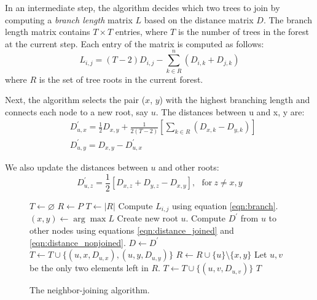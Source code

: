 \documentclass[11pt,letterpaper]{article}
\let\oldReturn\Return
\renewcommand{\Return}{\State\oldReturn}
\theoremstyle{definition}
\begin{document}
In an intermediate step, the algorithm decides which two trees to join by computing a \textit{branch length} matrix $L$ based on the distance matrix $D$. The branch length matrix contains $T \times T$ entries, where $T$ is the number of trees in the forest at the current step. Each entry of the matrix is computed as follows:  
\begin{equation}
  L_{i, j} = (T - 2) D_{i, j} - \sum_{k \in R}^n (D_{i, k} + D_{j, k})
  \label{eqn:branch}
\end{equation} where $R$ is the set of tree roots in the current forest.

Next, the algorithm selects the pair ($x$, $y$) with the highest branching length and connects each node to a new root, say $u$. The distances between u and x, y are:  
\begin{equation}
\begin{split}
  & D_{u, x}^{'} = \frac{1}{2} D_{x, y} + \frac{1}{2(T - 2)} \left[ \sum_{k \in R} (D_{x, k} - D_{y, k}) \right] 
\\  
& D_{u, y}^{'} = D_{x, y} - D_{u, x}^{'}
\end{split}
\label{eqn:distance_joined}
\end{equation}

We also update the distances between $u$ and other roots:
\begin{equation}
  D_{u, z}^{'} = \frac{1}{2} \left[ D_{x, z} + D_{y, z} - D_{x, y} \right], \ \ \ \text{for} \ z \neq x, y
\label{eqn:distance_nonjoined}
\end{equation}

\begin{figure}
  \begin{algorithmic}[1]
      \State $T \leftarrow \varnothing$ 
      \State $R \leftarrow P$
        \State $T \leftarrow |R|$
          \State Compute $L_{i, j}$ using equation \ref{eqn:branch}. 
        \EndFor
        \State $(x, y) \leftarrow \arg \max L$
        \State Create new root $u$.
        \State Compute $D^{'}$ from $u$ to other nodes using equations \ref{eqn:distance_joined} and \ref{eqn:distance_nonjoined}.
        \State $D \leftarrow D^{'}$
        \State $T \leftarrow T \cup \{(u, x, D_{u, x}), (u, y, D_{u, y})\}$
        \State $R \leftarrow R \cup \{u\} \setminus \{x, y\}$
      \EndFor
    \State Let $u, v$ be the only two elements left in $R$.
    \State $T \leftarrow T \cup \{(u, v, D_{u, v})\}$
    \Return $T$
   \EndFunction
  \end{algorithmic}
  \caption{\label{alg:nj}The neighbor-joining algorithm.}
\end{figure}
\end{document}

